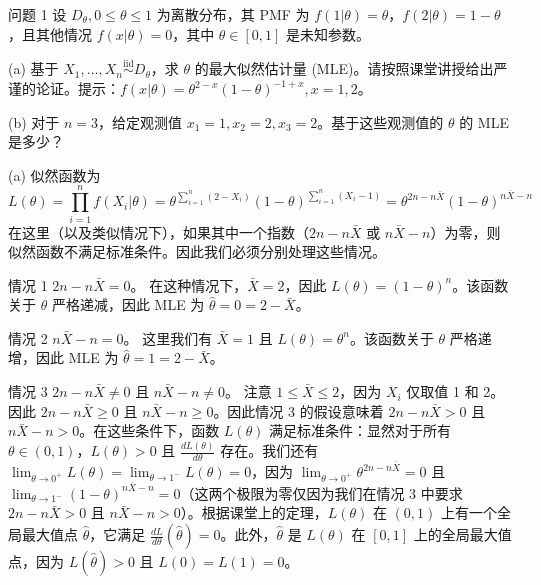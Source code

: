 \begin{questions}

\question 问题 1 设 $D_{\theta}, 0 \le \theta \le 1$ 为离散分布，其 PMF 为 $f(1|\theta) = \theta$，$f(2|\theta) = 1 - \theta$，且其他情况 $f(x|\theta) = 0$，其中 $\theta \in [0, 1]$ 是未知参数。

(a) 基于 $X_1, \dots, X_n \overset{\text{iid}}{\sim} D_{\theta}$，求 $\theta$ 的最大似然估计量 (MLE)。请按照课堂讲授给出严谨的论证。提示：$f(x|\theta) = \theta^{2-x}(1 - \theta)^{-1+x}, x = 1, 2$。

(b) 对于 $n = 3$，给定观测值 $x_1 = 1, x_2 = 2, x_3 = 2$。基于这些观测值的 $\theta$ 的 MLE 是多少？

\begin{solution}
(a) 似然函数为
\[
L(\theta) = \prod_{i=1}^n f(X_i|\theta) = \theta^{\sum_{i=1}^n (2-X_i)}(1 - \theta)^{\sum_{i=1}^n (X_i-1)} = \theta^{2n-n\bar{X}}(1 - \theta)^{n\bar{X}-n}
\]
在这里（以及类似情况下），如果其中一个指数（$2n - n\bar{X}$ 或 $n\bar{X} - n$）为零，则似然函数不满足标准条件。因此我们必须分别处理这些情况。

情况 1 $2n - n\bar{X} = 0$。
在这种情况下，$\bar{X} = 2$，因此 $L(\theta) = (1 - \theta)^n$。该函数关于 $\theta$ 严格递减，因此 MLE 为 $\hat{\theta} = 0 = 2 - \bar{X}$。

情况 2 $n\bar{X} - n = 0$。
这里我们有 $\bar{X} = 1$ 且 $L(\theta) = \theta^n$。该函数关于 $\theta$ 严格递增，因此 MLE 为 $\hat{\theta} = 1 = 2 - \bar{X}$。

情况 3 $2n - n\bar{X} \neq 0$ 且 $n\bar{X} - n \neq 0$。
注意 $1 \le \bar{X} \le 2$，因为 $X_i$ 仅取值 1 和 2。因此 $2n - n\bar{X} \ge 0$ 且 $n\bar{X} - n \ge 0$。因此情况 3 的假设意味着 $2n - n\bar{X} > 0$ 且 $n\bar{X} - n > 0$。在这些条件下，函数 $L(\theta)$ 满足标准条件：显然对于所有 $\theta \in (0, 1)$，$L(\theta) > 0$ 且 $\frac{dL(\theta)}{d\theta}$ 存在。我们还有 $\lim_{\theta \to 0^+} L(\theta) = \lim_{\theta \to 1^-} L(\theta) = 0$，因为 $\lim_{\theta \to 0^+} \theta^{2n-n\bar{X}} = 0$ 且 $\lim_{\theta \to 1^-} (1 - \theta)^{n\bar{X}-n} = 0$（这两个极限为零仅因为我们在情况 3 中要求 $2n - n\bar{X} > 0$ 且 $n\bar{X} - n > 0$）。根据课堂上的定理，$L(\theta)$ 在 $(0, 1)$ 上有一个全局最大值点 $\hat{\theta}$，它满足 $\frac{dL}{d\theta}(\hat{\theta}) = 0$。此外，$\hat{\theta}$ 是 $L(\theta)$ 在 $[0, 1]$ 上的全局最大值点，因为 $L(\hat{\theta}) > 0$ 且 $L(0) = L(1) = 0$。


\end{solution}
\end{questions}
